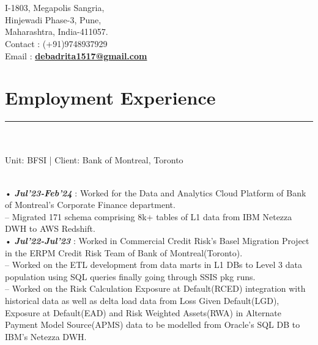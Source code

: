 \documentclass[]{DD_Resume_23}
\begin{document}
\begin{minipage}[t]{0.66\textwidth} 
\hspace*{0pt}\hfill    \\
\hspace*{0pt}\hfill    \\
\hspace*{0pt}\hfill I-1803, Megapolis Sangria,\\
\hspace*{0pt}\hfill Hinjewadi Phase-3, Pune,\\
\hspace*{0pt}\hfill Maharashtra, India-411057. \\
\hspace*{0pt}\hfill Contact : (+91)9748937929 \\
\hspace*{0pt}\hfill Email : \textbf{\href{mailto:debadrita1517@gmail.com}{debadrita1517@gmail.com}}
\section{Employment Experience}
\noindent\rule{12.5cm}{0.4pt}
 
\noindent
\hspace{5em}%
\begin{minipage}{0.85\textwidth\vspace{2pt}}\\
\\
Unit: BFSI | Client: Bank of Montreal, Toronto\\\

• \textbf{\textit{Jul'23-Feb'24}} : Worked for the Data and Analytics Cloud Platform of Bank of Montreal's Corporate Finance department.\\
-- Migrated 171 schema comprising 8k+ tables of L1 data from IBM Netezza DWH to AWS Redshift.\\
  
• \textbf{\textit{Jul'22-Jul'23}} : Worked in Commercial Credit Risk's Basel Migration Project in the ERPM Credit Risk Team of Bank of Montreal(Toronto).\\
-- Worked on the ETL development from data marts in L1 DBs to Level 3 data population using SQL queries finally going through SSIS pkg runs.\\
-- Worked on the Risk Calculation Exposure at Default(RCED) integration with historical data as well as delta load data from Loss Given Default(LGD), Exposure at Default(EAD) and Risk Weighted Assets(RWA) in Alternate Payment Model Source(APMS) data to be modelled from Oracle's SQL DB to IBM's Netezza DWH.\\


\end{minipage}
\end{minipage}
\end{document}
